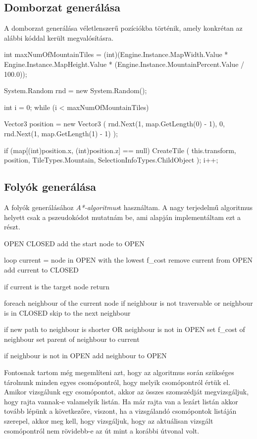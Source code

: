 \subsection{Domborzat generálása}

A domborzat generálása véletlenszerű pozíciókba történik, amely konkrétan az alábbi kóddal került megvalósításra.
\begin{cpp}
int maxNumOfMountainTiles = 
(int)(Engine.Instance.MapWidth.Value * Engine.Instance.MapHeight.Value * 
(Engine.Instance.MountainPercent.Value / 100.0));

System.Random rnd = new System.Random();

int i = 0;
while (i < maxNumOfMountainTiles)
{
   Vector3 position = new Vector3
   (
      rnd.Next(1, map.GetLength(0) - 1),
      0, rnd.Next(1, map.GetLength(1) - 1)
   );

   if (map[(int)position.x, (int)position.z] == null)
   {
      CreateTile
      (
         this.transform, position, TileTypes.Mountain, 
         SelectionInfoTypes.ChildObject
      );
      i++;
   }
}
\end{cpp}

\subsection{Folyók generálása}

A folyók generálásához \textit{A*-algoritmus}t használtam. A nagy terjedelmű algoritmus helyett csak a pszeudokódot mutatnám be, ami alapján implementáltam ezt a részt.
\begin{cpp}
OPEN 
CLOSED 
add the start node to OPEN

loop
   current = node in OPEN  with the lowest f_cost
   remove current from OPEN
   add current to CLOSED

   if current is the target node
      return

   foreach neighbour of the current node
      if neighbour is not traversable or neighbour is in CLOSED
         skip to the next neighbour

      if new path to neighbour is shorter OR neighbour is not in OPEN
         set f_cost of neighbour
         set parent of neighbour to current
         
         if neighbour is not in OPEN
            add neighbour to OPEN
\end{cpp}

Fontosnak tartom még megemlíteni azt, hogy az algoritmus során szükséges tárolnunk minden egyes csomópontról, hogy melyik csomópontról értük el. Amikor vizsgálunk egy csomópontot, akkor az összes szomszédját megvizsgáljuk, hogy rajta vannak-e valamelyik listán. Ha már rajta van a lezárt listán akkor tovább lépünk a következőre, viszont, ha a vizsgálandó csomópontok listáján szerepel, akkor meg kell, hogy vizsgáljuk, hogy az aktuálisan vizsgált csomópontról nem rövidebb-e az út mint a korábbi útvonal volt.

